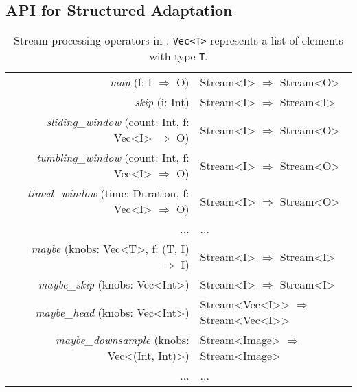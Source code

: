 \subsection{API for Structured Adaptation}
\label{sec:structure-adapt}

\begin{table*}
  \small
  \centering
  \begin{tabular}{ c r l }
    \toprule
    & \textit{map} (f: I $\Rightarrow$ O) & Stream<I> $\Rightarrow$ Stream<O> \\
    & \textit{skip} (i: Int) & Stream<I> $\Rightarrow$
                                   Stream<I> \\
    & \textit{sliding\_window} (count: Int, f: Vec<I> $\Rightarrow$ O) & Stream<I> $\Rightarrow$
                                                                            Stream<O> \\
    & \textit{tumbling\_window} (count: Int, f: Vec<I> $\Rightarrow$ O) & Stream<I> $\Rightarrow$
                                                                            Stream<O> \\
    & \textit{timed\_window} (time: Duration, f: Vec<I> $\Rightarrow$ O) & Stream<I> $\Rightarrow$
                                                                            Stream<O> \\
    & ... & ... \\
    \midrule
    & \textit{maybe} (knobs: Vec<T>, f:  (T, I) $\Rightarrow$ I) & Stream<I> $\Rightarrow$
                                                                 Stream<I> \\
    & \textit{maybe\_skip} (knobs: Vec<Int>) & Stream<I> $\Rightarrow$ Stream<I> \\
    & \textit{maybe\_head} (knobs: Vec<Int>) & Stream<Vec<I>{}> $\Rightarrow$
                                                   Stream<Vec<I>{}> \\
    & \textit{maybe\_downsample} (knobs: Vec<(Int, Int)>) & Stream<Image> $\Rightarrow$ Stream<Image> \\
    & ... & ... \\
    \bottomrule
  \end{tabular}
  \vspace{0.2em}
  \caption{Stream processing operators in \sysname{}. \texttt{Vec<T>} represents
    a list of elements with type \texttt{T}.}
  \label{tab:operators}
\end{table*}


